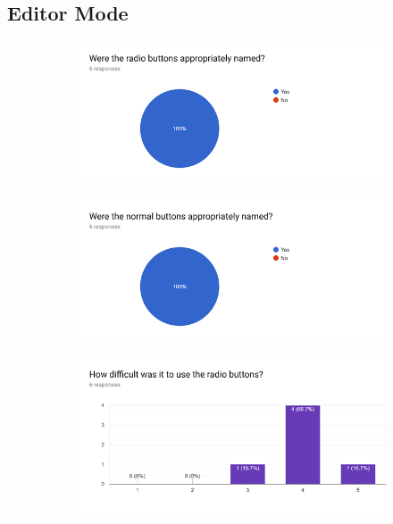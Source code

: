 \documentclass{l4proj}
\begin{document}
\begin{appendices}
\section{Editor Mode}

\begin{figure}[H]
\centering
\begin{subfigure}[b]{\textwidth}
\centering
\includegraphics[width=\textwidth]{A1/10.png}
\end{subfigure}
\end{figure}


\begin{figure}[H]
\centering
\begin{subfigure}[b]{\textwidth}
\centering
\includegraphics[width=\textwidth]{A1/11.png}
\end{subfigure}
\end{figure}

\begin{figure}[H]
\centering
\begin{subfigure}[b]{\textwidth}
\centering
\includegraphics[width=\textwidth]{A1/12.png}
\end{subfigure}
\end{figure}


\end{appendices}
\end{document}

